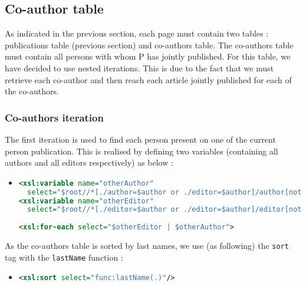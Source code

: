 \documentclass{article}
\begin{document}
  \subsection{Co-author table}
    \label{sec:coauthor}
    As indicated in the previous section, each page must contain two tables : publications table (previous section) and co-authors table. The co-authors table must contain all persons with whom P has jointly published. For this table, we have decided to use nested iterations. This is due to the fact that we must retrieve each co-author and then reach each article jointly published for each of the co-authors.
  
    \subsubsection{Co-authors iteration}
      The first iteration is used to find each person present on one of the current person publication. This is realised by defining two variables (containing all authors and all editors respectively) as below :
      \begin{itemize}
	\item \begin{lstlisting}[language=XML]
<xsl:variable name="otherAuthor" 
  select="$root//*[./author=$author or ./editor=$author]/author[not(.=$author)]" />
<xsl:variable name="otherEditor" 
  select="$root//*[./editor=$author or ./editor=$author]/editor[not(.=$author)]" />
  
<xsl:for-each select="$otherEditor | $otherAuthor">\end{lstlisting}
      \end{itemize}
      As the co-authors table is sorted by last names, we use (as following) the \verb|sort| tag with the \verb|lastName| function :
      \begin{itemize}
	\item \begin{lstlisting}[language=XML]
<xsl:sort select="func:lastName(.)"/>\end{lstlisting}
      \end{itemize}
      
\end{document}
